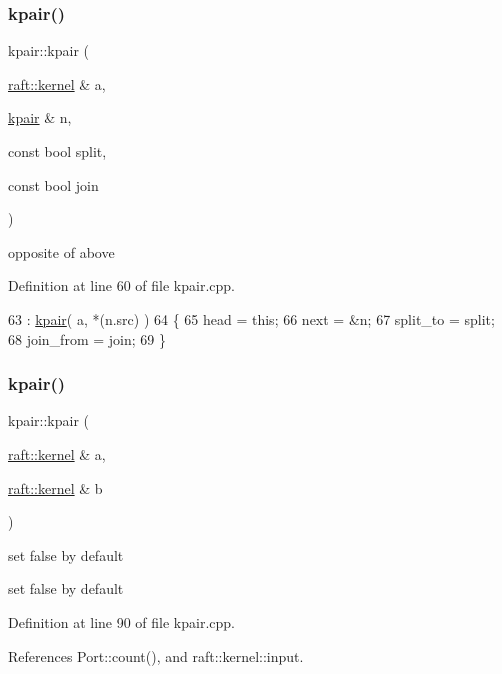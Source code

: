 \subsubsection{\texorpdfstring{kpair()}{kpair()}\hspace{0.1cm}{\footnotesize\ttfamily [2/3]}}
{\footnotesize\ttfamily kpair\+::kpair (\begin{DoxyParamCaption}\item[{\hyperlink{classraft_1_1kernel}{raft\+::kernel} \&}]{a,  }\item[{\hyperlink{classkpair}{kpair} \&}]{n,  }\item[{const bool}]{split,  }\item[{const bool}]{join }\end{DoxyParamCaption})}

opposite of above 

Definition at line 60 of file kpair.\+cpp.


\begin{DoxyCode}
63                                 : \hyperlink{classkpair}{kpair}( a, *(n.src) )
64 \{
65     head        = \textcolor{keyword}{this};
66     next        = &n;
67     split\_to    = split;
68     join\_from   = join;
69 \}
\end{DoxyCode}
\hypertarget{classkpair_a7ff7f76ea14d66007a4506c23bd235fc}{}\label{classkpair_a7ff7f76ea14d66007a4506c23bd235fc} 
\subsubsection{\texorpdfstring{kpair()}{kpair()}\hspace{0.1cm}{\footnotesize\ttfamily [3/3]}}
{\footnotesize\ttfamily kpair\+::kpair (\begin{DoxyParamCaption}\item[{\hyperlink{classraft_1_1kernel}{raft\+::kernel} \&}]{a,  }\item[{\hyperlink{classraft_1_1kernel}{raft\+::kernel} \&}]{b }\end{DoxyParamCaption})}

set false by default

set false by default 

Definition at line 90 of file kpair.\+cpp.



References Port\+::count(), and raft\+::kernel\+::input.


